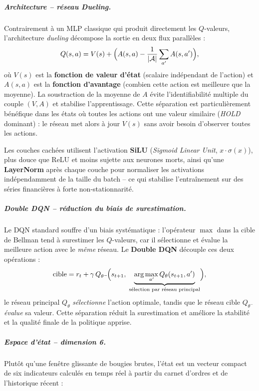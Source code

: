 \documentclass[11pt,a4paper]{article}
\begin{document}
\subparagraph{Architecture -- réseau Dueling.}
Contrairement à un MLP classique qui produit directement les
$Q$-valeurs, l'architecture \textit{dueling} décompose la sortie
en deux flux parallèles :
\[
Q(s,a) = V(s) + \Bigl(A(s,a) - \frac{1}{|\mathcal{A}|}\sum_{a'}A(s,a')\Bigr),
\]
où $V(s)$ est la \textbf{fonction de valeur d'état} (scalaire
indépendant de l'action) et $A(s,a)$ est la
\textbf{fonction d'avantage} (combien cette action est meilleure que
la moyenne). La soustraction de la moyenne de $A$ évite
l'identifiabilité multiple du couple $(V,A)$ et stabilise
l'apprentissage. Cette séparation est particulièrement bénéfique
dans les états où toutes les actions ont une valeur similaire
(\textit{HOLD} dominant) : le réseau met alors à jour $V(s)$
sans avoir besoin d'observer toutes les actions.

Les couches cachées utilisent l'activation \textbf{SiLU}
(\textit{Sigmoid Linear Unit}, $x\cdot\sigma(x)$), plus douce que
ReLU et moins sujette aux neurones morts, ainsi qu'une
\textbf{LayerNorm} après chaque couche pour normaliser les
activations indépendamment de la taille du batch -- ce qui
stabilise l'entraînement sur des séries financières à forte
non-stationnarité.

\subparagraph{Double DQN -- réduction du biais de surestimation.}
Le DQN standard souffre d'un biais systématique : l'opérateur
$\max$ dans la cible de Bellman tend à surestimer les
$Q$-valeurs, car il sélectionne et évalue la meilleure action
avec le \emph{même} réseau. Le \textbf{Double DQN} découple ces
deux opérations :
\[
\text{cible} = r_t + \gamma\,
Q_{\theta^-}\!\Bigl(s_{t+1},\;\underbrace{\arg\max_{a'}
Q_\theta(s_{t+1},a')}_{\text{sélection par réseau principal}}\Bigr),
\]
le réseau principal $Q_\theta$ \emph{sélectionne} l'action
optimale, tandis que le réseau cible $Q_{\theta^-}$
\emph{évalue} sa valeur. Cette séparation réduit la surestimation
et améliore la stabilité et la qualité finale de la politique
apprise.

\subparagraph{Espace d'état -- dimension 6.}
Plutôt qu'une fenêtre glissante de bougies brutes, l'état est
un vecteur compact de six indicateurs calculés en temps réel
à partir du carnet d'ordres et de l'historique récent :
\end{document}
